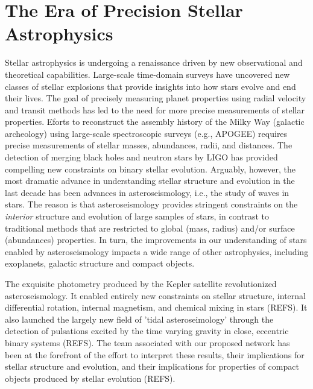 \section{The Era of Precision Stellar Astrophysics}

Stellar astrophysics is undergoing a renaissance driven by new observational and theoretical capabilities. Large-scale time-domain surveys have uncovered new classes of stellar explosions that provide insights into how stars evolve and end their lives.  The goal of precisely measuring planet properties using radial velocity and transit methods has led to the need for more precise measurements of stellar properties.  Eforts to reconstruct the assembly history of the Milky Way (galactic archeology) using large-scale spectroscopic surveys (e.g., APOGEE) requires precise measurements of stellar masses, abundances, radii, and distances.   The detection of merging black holes and neutron stars by LIGO has provided compelling new constraints on binary stellar evolution.  Arguably, however, the most dramatic advance in understanding stellar structure and evolution in the last decade has been advances in asteroseismology, i.e., the study of waves in stars.   The reason is that asteroseismology provides stringent constraints on the {\em interior} structure and evolution of large samples of stars, in contrast to traditional methods that are restricted to global (mass, radius) and/or surface (abundances) properties.   In turn, the improvements in our understanding of stars enabled by asteroseismology impacts a wide range of other astrophysics, including exoplanets, galactic structure and compact objects.  

The exquisite photometry produced by the Kepler satellite revolutionized asteroseismology.  It enabled entirely new constraints on stellar structure, internal differential rotation, internal magnetism, and chemical mixing in stars (REFS).  It also launched the largely new field of 'tidal asteroseimology' through the detection of pulsations excited by the time varying gravity in close, eccentric binary systems (REFS). The team associated with our proposed network has been at the forefront of the effort to interpret these results, their implications for stellar structure and evolution, and their implications for properties of compact objects produced by stellar evolution (REFS).   


